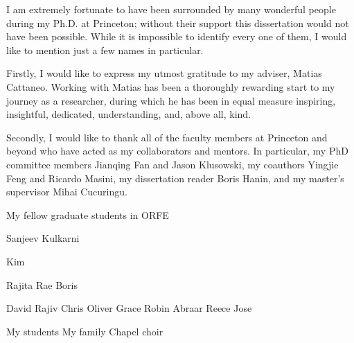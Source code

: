 
I am extremely fortunate to have been surrounded by many wonderful people during
my Ph.D. at Princeton; without their support this dissertation
would not have been possible. While it is impossible to identify every one of
them, I would like to mention just a few names in particular.

Firstly, I would like to express my utmost gratitude to my adviser,
Matias Cattaneo. Working with Matias has been a thoroughly rewarding start to my
journey as a researcher, during which he has been in equal measure inspiring,
insightful, dedicated, understanding, and, above all, kind.

Secondly, I would like to thank all of the faculty members at
Princeton and beyond who have acted as my collaborators and mentors.
In particular, my PhD committee members
Jianqing Fan and Jason Klusowski,
my coauthors Yingjie Feng and Ricardo Masini,
my dissertation reader Boris Hanin,
and my master's supervisor Mihai Cucuringu.

My fellow graduate students in ORFE

Sanjeev Kulkarni

Kim

Rajita
Rae
Boris

David
Rajiv
Chris
Oliver
Grace
Robin
Abraar
Reece
Jose

My students
My family
Chapel choir
